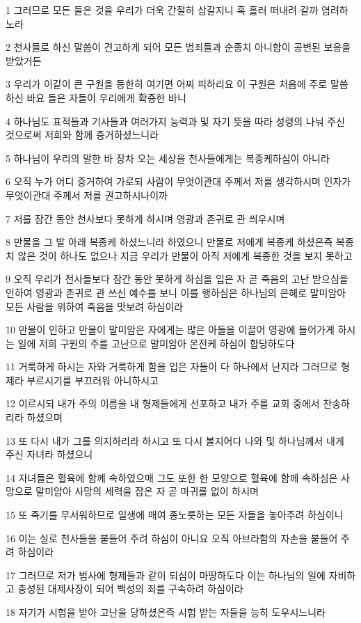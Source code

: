 \par 1 그러므로 모든 들은 것을 우리가 더욱 간절히 삼갈지니 혹 흘러 떠내려 갈까 염려하노라
\par 2 천사들로 하신 말씀이 견고하게 되어 모든 범죄들과 순종치 아니함이 공변된 보응을 받았거든
\par 3 우리가 이같이 큰 구원을 등한히 여기면 어찌 피하리요 이 구원은 처음에 주로 말씀하신 바요 들은 자들이 우리에게 확증한 바니
\par 4 하나님도 표적들과 기사들과 여러가지 능력과 및 자기 뜻을 따라 성령의 나눠 주신 것으로써 저희와 함께 증거하셨느니라
\par 5 하나님이 우리의 말한 바 장차 오는 세상을 천사들에게는 복종케하심이 아니라
\par 6 오직 누가 어디 증거하여 가로되 사람이 무엇이관대 주께서 저를 생각하시며 인자가 무엇이관대 주께서 저를 권고하시나이까
\par 7 저를 잠간 동안 천사보다 못하게 하시며 영광과 존귀로 관 씌우시며
\par 8 만물을 그 발 아래 복종케 하셨느니라 하였으니 만물로 저에게 복종케 하셨은즉 복종치 않은 것이 하나도 없으나 지금 우리가 만물이 아직 저에게 복종한 것을 보지 못하고
\par 9 오직 우리가 천사들보다 잠간 동안 못하게 하심을 입은 자 곧 죽음의 고난 받으심을 인하여 영광과 존귀로 관 쓰신 예수를 보니 이를 행하심은 하나님의 은혜로 말미암아 모든 사람을 위하여 죽음을 맛보려 하심이라
\par 10 만물이 인하고 만물이 말미암은 자에게는 많은 아들을 이끌어 영광에 들어가게 하시는 일에 저희 구원의 주를 고난으로 말미암아 온전케 하심이 합당하도다
\par 11 거룩하게 하시는 자와 거룩하게 함을 입은 자들이 다 하나에서 난지라 그러므로 형제라 부르시기를 부끄러워 아니하시고
\par 12 이르시되 내가 주의 이름을 내 형제들에게 선포하고 내가 주를 교회 중에서 찬송하리라 하셨으며
\par 13 또 다시 내가 그를 의지하리라 하시고 또 다시 볼지어다 나와 및 하나님께서 내게 주신 자녀라 하셨으니
\par 14 자녀들은 혈육에 함께 속하였으매 그도 또한 한 모양으로 혈육에 함께 속하심은 사망으로 말미암아 사망의 세력을 잡은 자 곧 마귀를 없이 하시며
\par 15 또 죽기를 무서워하므로 일생에 매여 종노릇하는 모든 자들을 놓아주려 하심이니
\par 16 이는 실로 천사들을 붙들어 주려 하심이 아니요 오직 아브라함의 자손을 붙들어 주려 하심이라
\par 17 그러므로 저가 범사에 형제들과 같이 되심이 마땅하도다 이는 하나님의 일에 자비하고 충성된 대제사장이 되어 백성의 죄를 구속하려 하심이라
\par 18 자기가 시험을 받아 고난을 당하셨은즉 시험 받는 자들을 능히 도우시느니라

